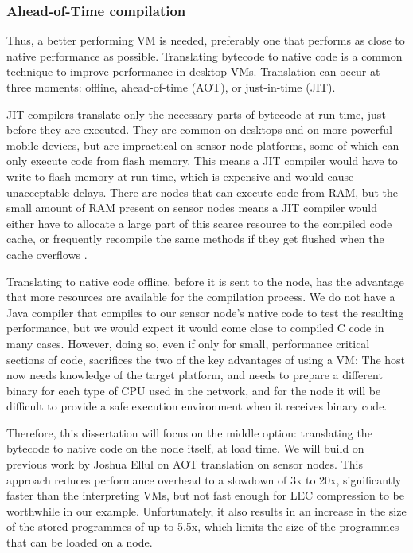 \subsubsection{Ahead-of-Time compilation}
Thus, a better performing VM is needed, preferably one that performs as close to native performance as possible. Translating bytecode to native code is a common technique to improve performance in desktop VMs. Translation can occur at three moments: offline, ahead-of-time (AOT), or just-in-time (JIT).

JIT compilers translate only the necessary parts of bytecode at run time, just before they are executed. They are common on desktops and on more powerful mobile devices, but are impractical on sensor node platforms, some of which can only execute code from flash memory. This means a JIT compiler would have to write to flash memory at run time, which is expensive and would cause unacceptable delays. There are nodes that can execute code from RAM, but the small amount of RAM present on sensor nodes means a JIT compiler would either have to allocate a large part of this scarce resource to the compiled code cache, or frequently recompile the same methods if they get flushed when the cache overflows \cite{Ellul:2012thesis}.

Translating to native code offline, before it is sent to the node, has the advantage that more resources are available for the compilation process. We do not have a Java compiler that compiles to our sensor node's native code to test the resulting performance, but we would expect it would come close to compiled C code in many cases. However, doing so, even if only for small, performance critical sections of code, sacrifices the two of the key advantages of using a VM: The host now needs knowledge of the target platform, and needs to prepare a different binary for each type of CPU used in the network, and for the node it will be difficult to provide a safe execution environment when it receives binary code.

Therefore, this dissertation will focus on the middle option: translating the bytecode to native code on the node itself, at load time. We will build on previous work by Joshua Ellul \cite{Ellul:2012thesis} on AOT translation on sensor nodes. This approach reduces performance overhead to a slowdown of 3x to 20x, significantly faster than the interpreting VMs, but not fast enough for LEC compression to be worthwhile in our example. Unfortunately, it also results in an increase in the size of the stored programmes of up to 5.5x, which limits the size of the programmes that can be loaded on a node.


